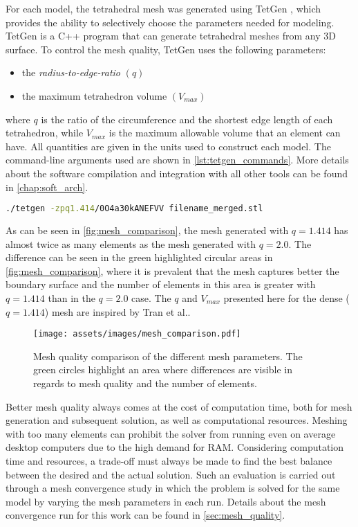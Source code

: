 For each model, the tetrahedral mesh was generated using TetGen \cite{tetgen}, which provides the ability to selectively choose the parameters needed for modeling. TetGen \cite{tetgen} is a C++ program that can generate tetrahedral meshes from any 3D surface. To control the mesh quality, TetGen \cite{tetgen} uses the following parameters:
\begin{itemize}
	\item the \textit{radius-to-edge-ratio} $(q)$
	\item the maximum tetrahedron volume $(V_{max})$
\end{itemize}
where $q$ is the ratio of the circumference and the shortest edge length of each tetrahedron, while $V_{max}$ is the maximum allowable volume that an element can have. All quantities are given in the units used to construct each model. The command-line arguments used are shown in \autoref{lst:tetgen_commands}. More details about the software compilation and integration with all other tools can be found in \autoref{chap:soft_arch}.

\begin{lstlisting}[language=bash,caption={Command to run TetGen},captionpos=b, label=lst:tetgen_commands]
	./tetgen -zpq1.414/0O4a30kANEFVV filename_merged.stl
\end{lstlisting}

As can be seen in \autoref{fig:mesh_comparison}, the mesh generated with $q = 1.414$ has almost twice as many elements as the mesh generated with $q = 2.0$. The difference can be seen in the green highlighted circular areas in \autoref{fig:mesh_comparison}, where it is prevalent that the mesh captures better the boundary surface and the number of elements in this area is greater with $q = 1.414$ than in the $q = 2.0$ case. The $q$ and $V_{max}$ presented here for the dense ($q=1.414$) mesh are inspired by Tran et al.\cite{Tran2020}.

\begin{figure}[H]
    \centering
    \texttt{[image: assets/images/mesh\_comparison.pdf]}
    \caption[Mesh quality comparison for the different $q$ parameters.]{Mesh quality comparison of the different mesh parameters. The green circles highlight an area where differences are visible in regards to mesh quality and the number of elements.}
    \label{fig:mesh_comparison}
\end{figure}

Better mesh quality always comes at the cost of computation time, both for mesh generation and subsequent solution, as well as computational resources. Meshing with too many elements can prohibit the solver from running even on average desktop computers due to the high demand for \gls{RAM}. Considering computation time and resources, a trade-off must always be made to find the best balance between the desired and the actual solution. Such an evaluation is carried out through a mesh convergence study in which the problem is solved for the same model by varying the mesh parameters in each run. Details about the mesh convergence run for this work can be found in \ref{sec:mesh_quality}.

